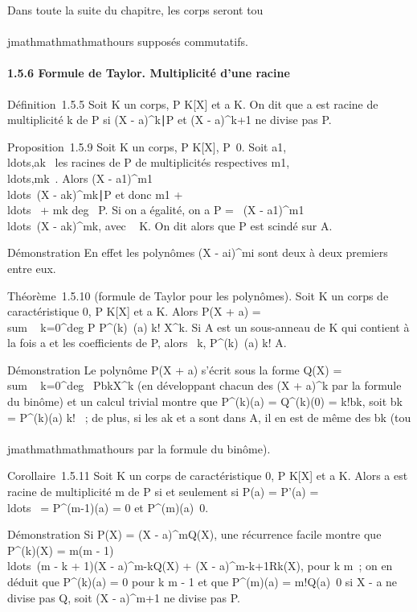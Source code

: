 Dans toute la suite du chapitre, les corps seront tou\\\\jmathmathmathmathours supposés
commutatifs.

\paragraph{1.5.6 Formule de Taylor. Multiplicité d'une racine}

Définition~1.5.5 Soit K un corps, P \in K{[}X{]} et a \in K. On dit que a
est racine de multiplicité k de P si (X -
a)^k∣P et (X - a)^k+1 ne
divise pas P.

Proposition~1.5.9 Soit K un corps, P \in K{[}X{]},
P\neq~0. Soit
a1,\\ldots,ak~
les racines de P de multiplicités respectives
m1,\\ldots,mk~.
Alors (X -
a1)^m1\\ldots~(X
- ak)^mk∣P et
donc m1 +
\\ldots~ +
mk \leq deg~ P. Si on a égalité, on a P
= \lambda~(X -
a1)^m1\\ldots~(X
- ak)^mk, avec \lambda~ \in K. On dit alors que P
est scindé sur A.

Démonstration En effet les polynômes (X -
ai)^mi sont deux à deux premiers entre eux.

Théorème~1.5.10 (formule de Taylor pour les polynômes). Soit K un corps
de caractéristique 0, P \in K{[}X{]} et a \in K. Alors P(X + a)
= \\sum ~
k=0^deg P P^(k)~(a)
\over k! X^k. Si A est un sous-anneau de K
qui contient à la fois a et les coefficients de P, alors
\forall~k, P^(k)~(a) \over
k! \in A.

Démonstration Le polynôme P(X + a) s'écrit sous la forme Q(X)
= \\sum ~
k=0^deg~
PbkX^k (en développant chacun des (X +
a)^k par la formule du binôme) et un calcul trivial montre que
P^(k)(a) = Q^(k)(0) = k!bk, soit
bk = P^(k)(a) \over k! ~; de
plus, si les ak et a sont dans A, il en est de même des
bk (tou\\\\jmathmathmathmathours par la formule du binôme).

Corollaire~1.5.11 Soit K un corps de caractéristique 0, P \in K{[}X{]} et
a \in K. Alors a est racine de multiplicité m de P si et seulement si P(a)
= P'(a) = \\ldots~ =
P^(m-1)(a) = 0 et
P^(m)(a)\neq~0.

Démonstration Si P(X) = (X - a)^mQ(X), une récurrence facile
montre que P^(k)(X) = m(m -
1)\\ldots~(m - k +
1)(X - a)^m-kQ(X) + (X - a)^m-k+1Rk(X),
pour k \leq m~; on en déduit que P^(k)(a) = 0 pour k \leq m - 1 et
que P^(m)(a) = m!Q(a)\neq~0 si X - a
ne divise pas Q, soit (X - a)^m+1 ne divise pas P.

